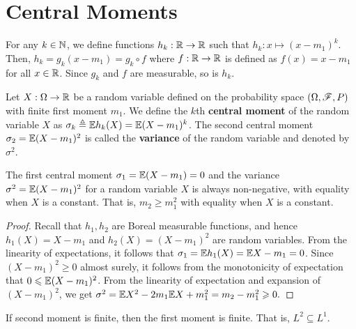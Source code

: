 \documentclass[letterpaper,10pt,english]{article}
\begin{document}
\section{Central Moments}
\begin{shaded}
\begin{exmp} 
For any $k \in \mathbb{N}$, we define functions $h_k: \mathbb{R} \to \mathbb{R}$ such that $h_k: x \mapsto (x-m_1)^k$. 
Then, $h_k = g_k(x-m_1) = g_k\circ f$ where $f:\mathbb{R} \to\mathbb{R}$ is defined as $f(x) = x-m_1$ for all $x \in \mathbb{R}$. 
Since $g_k$ and $f$ are measurable, so is $h_k$. 
\end{exmp}
\end{shaded}
\begin{defn} 
Let $X: \Omega \to \mathbb{R}$ be a random variable defined on the probability space $(\Omega, \mathscr{F}, P)$ with finite first moment $m_1$. 
We define the $k$th \textbf{central moment} of the random variable $X$ as $\sigma_k \triangleq \mathbb{E} h_k(X) = \mathbb{E} (X-m_1)^k$. 
The second central moment $\sigma_2 = \mathbb{E}(X-m_1)^2$ is called the \textbf{variance} of the random variable and denoted by $\sigma^2$.  
\end{defn}
\begin{lem} 
The first central moment $\sigma_1= \mathbb{E}(X-m_1) = 0$ and the variance $\sigma^2 = \mathbb{E}(X-m_1)^2$ for a random variable $X$ is always non-negative, 
with equality when $X$ is a constant. 
That is, $m_2 \ge m_1^2$ with equality when $X$ is a constant. 
\end{lem}
\begin{proof}
Recall that $h_1, h_2$ are Boreal measurable functions, and hence $h_1(X) = X- m_1$ and $h_2(X) = (X-m_1)^2$ are random variables. 
From the linearity of expectations, it follows that $\sigma_1 = \mathbb{E} h_1(X) = \mathbb{E} X - m_1 = 0$. 
Since $(X-m_1)^2 \ge 0$ almost surely, it follows from the monotonicity of expectation that $0 \leqslant \mathbb{E}(X-m_1)^2$.  
From the linearity of expectation and expansion of $(X-m_1)^2$, we get 
$
\sigma^2 = \mathbb{E} X^2 - 2m_1\mathbb{E} X + m_1^2 = m_2 - m_1^2 \geqslant 0.
$
\end{proof}
\begin{rem} 
If second moment is finite, then the first moment is finite. 
That is, $L^2 \subseteq L^1$. 
\end{rem}

\end{document}
